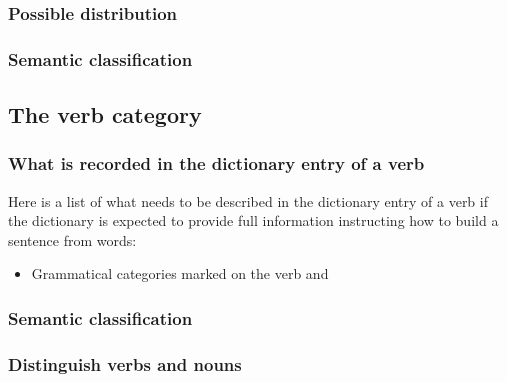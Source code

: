 \documentclass[UTF8, a4paper, oneside, scheme=plain]{ctexart}
\begin{document}
\subsubsection{Possible distribution}



\subsubsection{Semantic classification}

\subsection{The verb category}

\subsubsection{What is recorded in the dictionary entry of a verb}

Here is a list of what needs to be described in the dictionary entry of a verb
if the dictionary is expected to provide full information instructing 
how to build a sentence from words:
\begin{itemize}
    \item Grammatical categories marked on the verb and 
\end{itemize}

\subsubsection{Semantic classification}

\subsubsection{Distinguish verbs and nouns}
\end{document}
